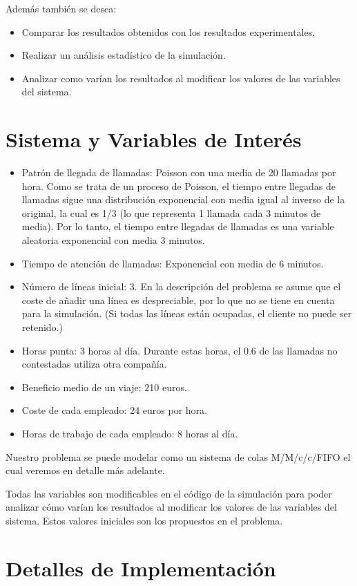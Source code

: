 \documentclass{article}
\begin{document}
Además también se desea:
\begin{itemize}
    \item Comparar los resultados obtenidos con los resultados experimentales.
    \item Realizar un análisis estadístico de la simulación.
    \item Analizar como varían los resultados al modificar los valores de las variables del sistema.
\end{itemize}

\section{Sistema y Variables de Interés}
\begin{itemize}
    \item Patrón de llegada de llamadas: Poisson con una media de 20 llamadas por hora. Como se trata de un proceso de Poisson, el tiempo entre llegadas de llamadas sigue una distribución exponencial con media igual al inverso de la original, la cual es 1/3 (lo que representa 1 llamada cada 3 minutos de media). Por lo tanto, el tiempo entre llegadas de llamadas es una variable aleatoria exponencial con media 3 minutos.
    \item Tiempo de atención de llamadas: Exponencial con media de 6 minutos.
    \item Número de líneas inicial: 3. En la descripción del problema se asume que el coste de añadir una línea es despreciable, por lo que no se tiene en cuenta para la simulación. (Si todas las líneas están ocupadas, el cliente no puede ser retenido.)
    \item Horas punta: 3 horas al día. Durante estas horas, el 0.6 de las llamadas no contestadas utiliza otra compañía.
    \item Beneficio medio de un viaje: 210 euros.
    \item Coste de cada empleado: 24 euros por hora.
    \item Horas de trabajo de cada empleado: 8 horas al día.
\end{itemize}

Nuestro problema se puede modelar como un sistema de colas M/M/c/c/FIFO el cual veremos en detalle más adelante.


Todas las variables son modificables en el código de la simulación para poder analizar cómo varían los resultados al modificar los valores de las variables del sistema. Estos valores iniciales son los propuestos en el problema.
\section{Detalles de Implementación}
\end{document}
